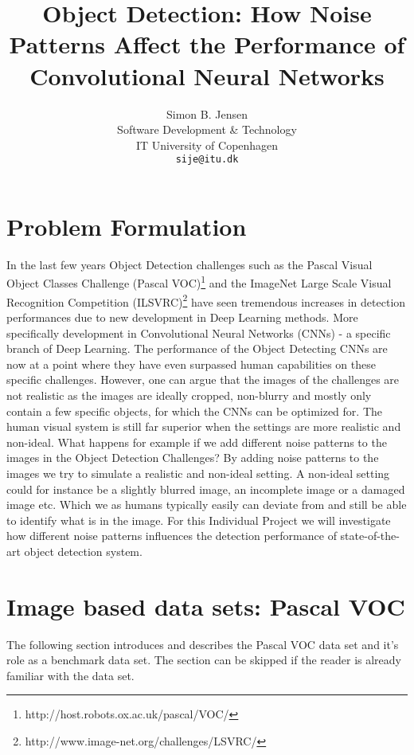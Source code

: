 \documentclass{article}
\title{Object Detection: How Noise Patterns Affect the Performance of Convolutional Neural Networks}
\author{
  Simon B. Jensen\\
  Software Development \& Technology\\
  IT University of Copenhagen\\
  \texttt{sije@itu.dk} \\
}
\begin{document}

\maketitle

\section{Problem Formulation}
\label{sec:problem-formulation}
In the last few years Object Detection challenges such as the Pascal Visual Object Classes Challenge (Pascal VOC)\footnote{http://host.robots.ox.ac.uk/pascal/VOC/} and the ImageNet Large Scale Visual Recognition Competition (ILSVRC)\footnote{http://www.image-net.org/challenges/LSVRC/} have seen tremendous increases in detection performances due to new development in Deep Learning methods. More specifically development in Convolutional Neural Networks (CNNs) - a specific branch of Deep Learning. The performance of the Object Detecting CNNs are now at a point where they have even surpassed human capabilities on these specific challenges. However, one can argue that the images of the challenges are not realistic as the images are ideally cropped, non-blurry and mostly only contain a few specific objects, for which the CNNs can be optimized for. The human visual system is still far superior when the settings are more realistic and non-ideal. What happens for example if we add different noise patterns to the images in the Object Detection Challenges? By adding noise patterns to the images we try to simulate a realistic and non-ideal setting. A non-ideal setting could for instance be a slightly blurred image, an incomplete image or a damaged image etc. Which we as humans typically easily can deviate from and still be able to identify what is in the image. 
For this Individual Project we will investigate how different noise patterns influences the detection performance of state-of-the-art object detection system. 

\section{Image based data sets: Pascal VOC}
The following section introduces and describes the Pascal VOC data set and it's role as a benchmark data set. The section can be skipped if the reader is already familiar with the data set.
\end{document}
